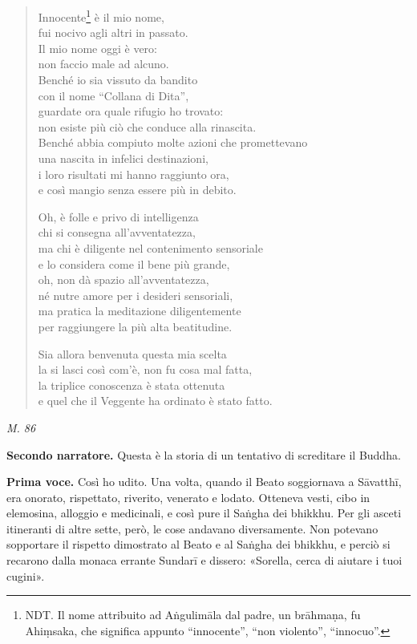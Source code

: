 \begin{quotation}
Innocente\footnote{NDT. Il nome attribuito ad Aṅgulimāla dal padre, un brāhmaṇa, fu Ahiṃsaka, che significa appunto “innocente”, “non violento”, “innocuo”.} è il mio nome, \\
fui nocivo agli altri in passato. \\
Il mio nome oggi è vero: \\
non faccio male ad alcuno. \\
Benché io sia vissuto da bandito \\
con il nome “Collana di Dita”, \\
guardate ora quale rifugio ho trovato: \\
non esiste più ciò che conduce alla rinascita. \\
Benché abbia compiuto molte azioni che promettevano \\
una nascita in infelici destinazioni, \\
i loro risultati mi hanno raggiunto ora, \\
e così mangio senza essere più in debito.


Oh, è folle e privo di intelligenza \\
chi si consegna all’avventatezza, \\
ma chi è diligente nel contenimento sensoriale \\
e lo considera come il bene più grande, \\
oh, non dà spazio all’avventatezza, \\
né nutre amore per i desideri sensoriali, \\
ma pratica la meditazione diligentemente \\
per raggiungere la più alta beatitudine.


Sia allora benvenuta questa mia scelta \\
la si lasci così com’è, non fu cosa mal fatta, \\
la triplice conoscenza è stata ottenuta \\
e quel che il Veggente ha ordinato è stato fatto.
\end{quotation}

\emph{M. 86}


\textbf{Secondo narratore.} Questa è la storia di un tentativo di screditare il
Buddha.


\textbf{Prima voce.} Così ho udito. Una volta, quando il Beato soggiornava a
Sāvatthī, era onorato, rispettato, riverito, venerato e lodato. Otteneva
vesti, cibo in elemosina, alloggio e medicinali, e così pure il Saṅgha
dei bhikkhu. Per gli asceti itineranti di altre sette, però, le cose
andavano diversamente. Non potevano sopportare il rispetto dimostrato al
Beato e al Saṅgha dei bhikkhu, e perciò si recarono dalla monaca errante
Sundarī e dissero: «Sorella, cerca di aiutare i tuoi cugini».


